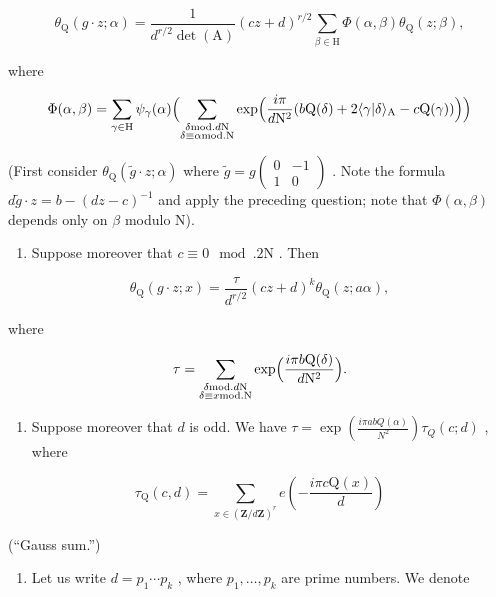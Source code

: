 \[
\theta_ {\mathrm{Q}} (g \cdot z; \alpha) = \frac {1}{d ^ {r / 2} \det (\mathrm{A})} (c z + d) ^ {r / 2} \sum_ {\beta \in \mathrm{H}} \Phi (\alpha , \beta) \theta_ {\mathrm{Q}} (z; \beta),
\]

where

\[
\Phi (\alpha ,\beta) = \sum_{\gamma \in \mathrm{H}}\psi_{\gamma}(\alpha)\Bigl (\sum_{\substack{\delta \text{mod.} d\mathrm{N}\\ \delta \equiv \alpha \text{mod.}\mathrm{N}}}\exp \Bigl (\frac{i\pi}{d\mathrm{N}^{2}} (b\mathrm{Q}(\delta) + 2\langle \gamma |\delta \rangle_{\mathrm{A}} - c\mathrm{Q}(\gamma))\Bigr)\Bigr)
\]

(First consider \(\theta_{\mathrm{Q}}(\widetilde{g} \cdot z; \alpha)\) where \(\widetilde{g} = g\begin{pmatrix} 0 & -1 \\ 1 & 0 \end{pmatrix}\) . Note the formula \(d\widetilde{g} \cdot z = b - (dz - c)^{-1}\) and apply the preceding question; note that \(\Phi(\alpha, \beta)\) depends only on \(\beta\) modulo N).

\begin{enumerate}
\def\labelenumi{\alph{enumi})}
\setcounter{enumi}{7}
\tightlist
\item
  Suppose moreover that \(c \equiv 0 \mod. 2\mathrm{N}\) . Then
\end{enumerate}

\[
\theta_ {\mathrm{Q}} (g \cdot z; x) = \frac {\tau}{d ^ {r / 2}} (c z + d) ^ {k} \theta_ {\mathrm{Q}} (z; a \alpha),
\]

where

\[
\tau = \sum_{\substack{\delta \text{mod.} d\mathrm{N}\\ \delta \equiv x\text{mod.}\mathrm{N}}}\exp \Bigl (\frac{i\pi b\mathrm{Q}(\delta)}{d\mathrm{N}^{2}}\Bigr).
\]

\begin{enumerate}
\def\labelenumi{\roman{enumi})}
\tightlist
\item
  Suppose moreover that \(d\) is odd. We have \(\tau = \exp \left(\frac{i\pi abQ(\alpha)}{N^2}\right)\tau_Q(c;d)\) , where
\end{enumerate}

\[
\tau_ {\mathrm{Q}} (c, d) = \sum_ {x \in (\mathbf {Z} / d \mathbf {Z}) ^ {r}} e \left(- \frac {i \pi c \mathrm{Q} (x)}{d}\right)
\]

(“Gauss sum.”)

\begin{enumerate}
\def\labelenumi{\alph{enumi})}
\setcounter{enumi}{9}
\tightlist
\item
  Let us write \(d = p_{1} \cdots p_{k}\) , where \(p_{1}, \ldots, p_{k}\) are prime numbers. We denote
\end{enumerate}

